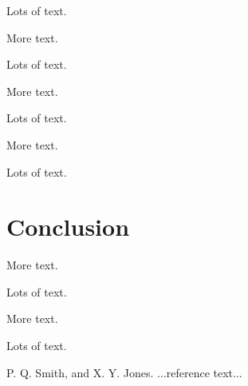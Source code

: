 \documentclass{sigplanconf}[10pt]
\begin{document}
Lots of text.

More text.

Lots of text.

More text.

Lots of text.

More text.

Lots of text.
\section{Conclusion}
\label{conclusion}
More text.

Lots of text.

More text.

Lots of text.






\begin{thebibliography}{}
\softraggedright

P. Q. Smith, and X. Y. Jones. ...reference text...

\end{thebibliography}
\end{document}
